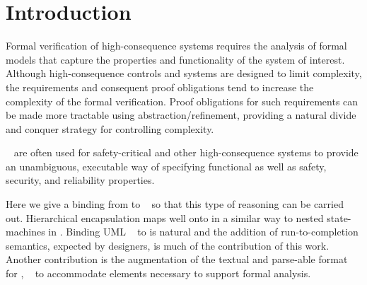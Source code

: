 
\section{Introduction}
\label{sec:introduction}

Formal verification of high-consequence systems requires the analysis
of formal models that capture the properties and functionality of the
system of interest. Although high-consequence controls and systems are
designed to limit complexity, the requirements and consequent proof
obligations tend to increase the complexity of the formal verification.  
Proof obligations for such requirements can be made more tractable using
abstraction/refinement, providing a natural divide and conquer
strategy for controlling complexity.

\Statecharts~\cite{Harel} are often used for safety-critical and other high-consequence systems to provide an unambiguous, executable way of specifying functional as well as safety, security, and reliability properties. 

Here we give a binding from \Statecharts to \EventB~\cite{abrial10:_model_event_b} so that this type of reasoning can be carried out.
Hierarchical encapsulation maps well onto \Statecharts in a similar way to nested state-machines in \iUMLB.
Binding UML \Statecharts~\cite{Rumbaugh2004} to \iUMLB is natural and the addition of run-to-completion semantics, expected by \Statechart
designers, is much of the contribution of this work.  
Another contribution is the augmentation of the textual and parse-able format for \Statecharts, \SCXML~\cite{scxmlwebsite} to accommodate elements necessary to support formal analysis. 

